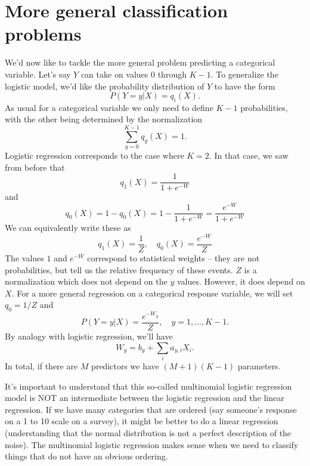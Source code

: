 \section{More general classification problems}
We'd now like to tackle the more general problem predicting a categorical variable. Let's say $Y$ can take on values $0$ through $K-1$. To generalize the logistic model, we'd like the probability distribution of $Y$ to have the form 
\begin{equation}
P(Y=y|X) = q_i(X).
\end{equation}
As usual for a categorical variable we only need to define $K-1$ probabilities, with the other being determined by the normalization 
\begin{equation}
\sum_{y=0}^{K-1} q_y(X) = 1.
\end{equation}
Logistic regression corresponds to the case where $K=2$. In that case, we saw from before that 
\begin{equation}
q_1(X) = \frac{1}{1+e^{-W}}
\end{equation}
and 
\begin{equation}
q_0(X) = 1-q_0(X) = 1-\frac{1}{1+e^{-W}}= \frac{e^{-W}}{1+e^{-W}} 
\end{equation}
We can equivalently write these as 
\begin{equation}
q_1(X) = \frac{1}{Z},\quad q_0(X) = \frac{e^{-W}}{Z}
\end{equation}
The values $1$ and $e^{-W}$ correspond to {\dfn statistical weights} -- they are not probabilities, but tell us the relative frequency of these events. $Z$ is a normalization which does not depend on the $y$ values. However, it does depend on $X$. For a more general regression on a categorical response variable, we will set $q_0 = 1/Z$ and  
\begin{equation}
P(Y=y|X) = \frac{e^{-W_y}}{Z},\quad y = 1,\dots,K-1.
\end{equation}
By analogy with logistic regression, we'll have
\begin{equation}
W_y = b_y + \sum_i a_{y,i}X_i.
\end{equation}
In total, if there are $M$ predictors we have $(M+1)(K-1)$ parameters. 

It's important to understand that this so-called multinomial logistic regression model is NOT an intermediate between the logistic regression and the linear regression. If we have many categories that are ordered (say someone's response on a 1 to 10 scale on a survey), it might be better to do a linear regression (understanding that the normal distribution is not a perfect description of the noise). The multinomial logistic regression makes sense when we need to classify things that do not have an obvious ordering. 




